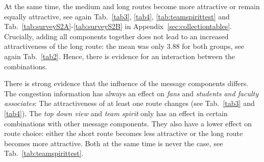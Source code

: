 At the same time, the medium and long routes become more attractive or remain equally attractive, see again Tab.~\ref{tab3}, \ref{tab4}, \ref{tab:teamspirittest} and Tab.~\ref{tab:surveyS2A}-\ref{tab:surveyS2B} in Appendix~\ref{sec:collectiontables}. 
Crucially, adding all components together does not lead to an increased attractiveness of the long route: the mean was only 3.88 for both groups, see again Tab.~\ref{tab2}. Hence, there is evidence for an interaction between the combinations. 

There is strong evidence that the influence of the message components differs. The congestion information has always an effect on \textit{fans} and \textit{students and faculty associates}: The attractiveness of at least one route changes (see Tab.~\ref{tab3} and \ref{tab4}). 
The \textit{top down view} and \textit{team spirit} only has an effect in certain combinations with other message components. They also have a lower effect on route choice: either the short route becomes less attractive or the long route becomes more attractive. Both at the same time is never the case, see Tab.~\ref{tab:teamspirittest}.


 





